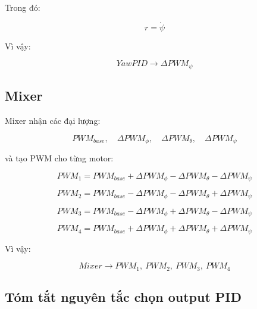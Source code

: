 Trong đó:

\begin{equation}
    r = \dot{\psi}
\end{equation}

Vì vậy:

\begin{equation}
    \boxed{
    YawPID
    \longrightarrow
    \Delta PWM_\psi
    }
\end{equation}

\subsection{Mixer}

Mixer nhận các đại lượng:

\begin{equation}
    PWM_{base},\quad
    \Delta PWM_\phi,\quad
    \Delta PWM_\theta,\quad
    \Delta PWM_\psi
\end{equation}

và tạo PWM cho từng motor:

\begin{equation}
    PWM_1
    =
    PWM_{base}
    +
    \Delta PWM_\phi
    -
    \Delta PWM_\theta
    -
    \Delta PWM_\psi
\end{equation}

\begin{equation}
    PWM_2
    =
    PWM_{base}
    -
    \Delta PWM_\phi
    -
    \Delta PWM_\theta
    +
    \Delta PWM_\psi
\end{equation}

\begin{equation}
    PWM_3
    =
    PWM_{base}
    -
    \Delta PWM_\phi
    +
    \Delta PWM_\theta
    -
    \Delta PWM_\psi
\end{equation}

\begin{equation}
    PWM_4
    =
    PWM_{base}
    +
    \Delta PWM_\phi
    +
    \Delta PWM_\theta
    +
    \Delta PWM_\psi
\end{equation}

Vì vậy:

\begin{equation}
    \boxed{
    Mixer
    \longrightarrow
    PWM_1,\ PWM_2,\ PWM_3,\ PWM_4
    }
\end{equation}

\subsection{Tóm tắt nguyên tắc chọn output PID}

